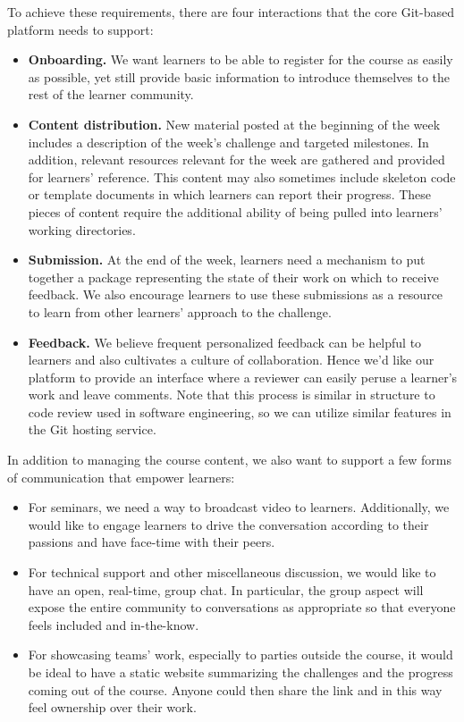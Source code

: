 \documentclass[12pt,twoside,vi]{mitthesis}
\begin{document}
To achieve these requirements, there are four interactions that the core Git-based platform needs to support:
\begin{itemize}
\item \textbf{Onboarding.} We want learners to be able to register for the course as easily as possible, yet still provide basic information to introduce themselves to the rest of the learner community. 
\item \textbf{Content distribution.} New material posted at the beginning of the week includes a description of the week's challenge and targeted milestones. In addition, relevant resources relevant for the week are gathered and provided for learners' reference. This content may also sometimes include skeleton code or template documents in which learners can report their progress. These pieces of content require the additional ability of being pulled into learners' working directories.
\item \textbf{Submission.} At the end of the week, learners need a mechanism to put together a package representing the state of their work on which to receive feedback. We also encourage learners to use these submissions as a resource to learn from other learners' approach to the challenge.
\item \textbf{Feedback.} We believe frequent personalized feedback can be helpful to learners and also cultivates a culture of collaboration. Hence we'd like our platform to provide an interface where a reviewer can easily peruse a learner's work and leave comments. Note that this process is similar in structure to code review used in software engineering, so we can utilize similar features in the Git hosting service.
\end{itemize}

In addition to managing the course content, we also want to support a few forms of communication that empower learners:
\begin{itemize}
\item For seminars, we need a way to broadcast video to learners. Additionally, we would like to engage learners to drive the conversation according to their passions and have face-time with their peers.
\item For technical support and other miscellaneous discussion, we would like to have an open, real-time, group chat. In particular, the group aspect will expose the entire community to conversations as appropriate so that everyone feels included and in-the-know.
\item For showcasing teams' work, especially to parties outside the course, it would be ideal to have a static website summarizing the challenges and the progress coming out of the course. Anyone could then share the link and in this way feel ownership over their work.
\end{itemize}
\end{document}
